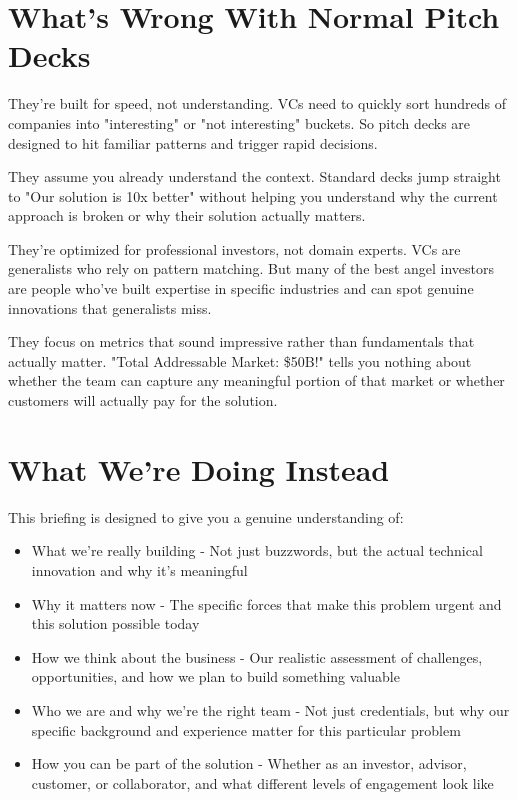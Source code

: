 \documentclass[11pt,letterpaper]{article}
\begin{document}
\section*{What's Wrong With Normal Pitch Decks}

They're built for speed, not understanding. VCs need to quickly sort hundreds of companies into "interesting" or "not interesting" buckets. So pitch decks are designed to hit familiar patterns and trigger rapid decisions.

They assume you already understand the context. Standard decks jump straight to "Our solution is 10x better" without helping you understand why the current approach is broken or why their solution actually matters.

They're optimized for professional investors, not domain experts. VCs are generalists who rely on pattern matching. But many of the best angel investors are people who've built expertise in specific industries and can spot genuine innovations that generalists miss.

They focus on metrics that sound impressive rather than fundamentals that actually matter. "Total Addressable Market: \$50B!" tells you nothing about whether the team can capture any meaningful portion of that market or whether customers will actually pay for the solution.

\section*{What We're Doing Instead}

This briefing is designed to give you a genuine understanding of:
\begin{itemize}[leftmargin=10pt, itemsep=1pt]
    \item What we're really building - Not just buzzwords, but the actual technical innovation and why it's meaningful
    \item Why it matters now - The specific forces that make this problem urgent and this solution possible today
    \item How we think about the business - Our realistic assessment of challenges, opportunities, and how we plan to build something valuable
    \item Who we are and why we're the right team - Not just credentials, but why our specific background and experience matter for this particular problem
    \item How you can be part of the solution - Whether as an investor, advisor, customer, or collaborator, and what different levels of engagement look like
\end{itemize}
\end{document}
